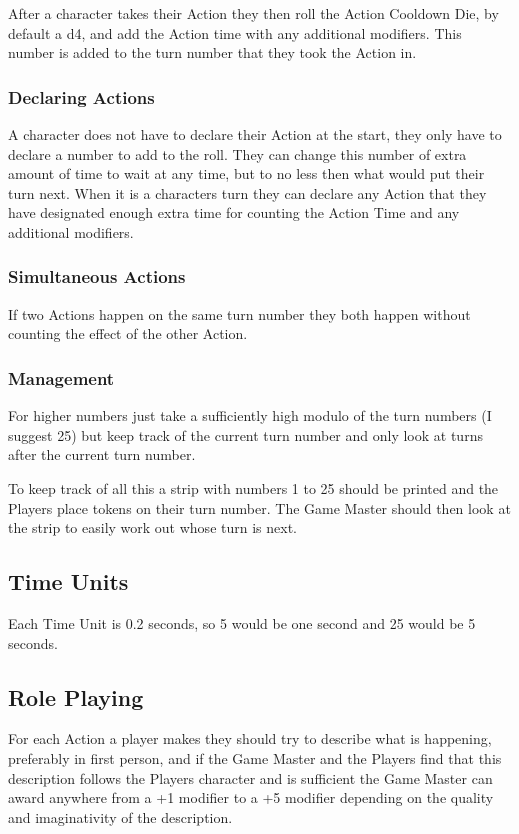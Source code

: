 \documentclass[a4paper,12pt,oneside]{book}
\begin{document}
                    After a character takes their Action they then roll the Action Cooldown Die, by default a d4, and add the Action time with any additional modifiers. This number is added to the turn number that they took the Action in.

                \subsubsection{Declaring Actions}
                    A character does not have to declare their Action at the start, they only have to declare a number to add to the roll. They can change this number of extra amount of time to wait at any time, but to no less then what would put their turn next. When it is a characters turn they can declare any Action that they have designated enough extra time for counting the Action Time and any additional modifiers.

                \subsubsection{Simultaneous Actions}
                    If two Actions happen on the same turn number they both happen without counting the effect of the other Action.

                \subsubsection{Management}
                    For higher numbers just take a sufficiently high modulo of the turn numbers (I suggest 25) but keep track of the current turn number and only look at turns after the current turn number.

                    To keep track of all this a strip with numbers 1 to 25 should be printed and the Players place tokens on their turn number. The Game Master should then look at the strip to easily work out whose turn is next.

                \subsection{Time Units}
                    Each Time Unit is 0.2 seconds, so 5 would be one second and 25 would be 5 seconds.

            \subsection{Role Playing}
                For each Action a player makes they should try to describe what is happening, preferably in first person, and if the Game Master and the Players find that this description follows the Players character and is sufficient the Game Master can award anywhere from a +1 modifier to a +5 modifier depending on the quality and imaginativity of the description.
\end{document}
